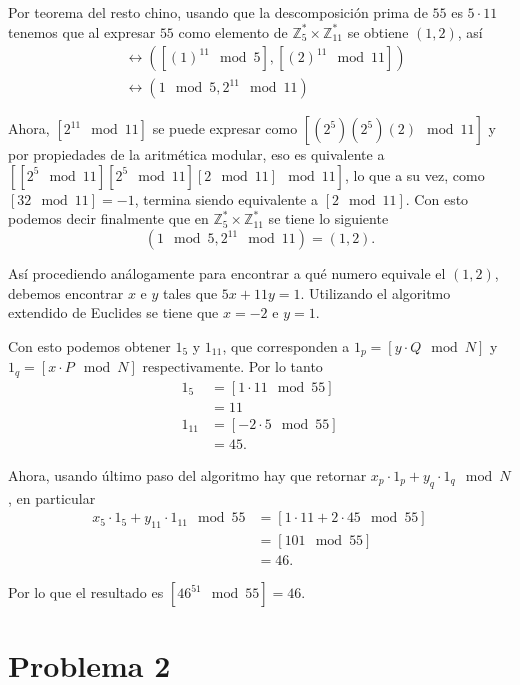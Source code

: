 \documentclass[twoside]{tareas}
\begin{document}
\begin{enumerate}
    Por teorema del resto chino, usando que la descomposición prima de $55$ es $5 \cdot 11$ tenemos que al expresar $55$ como elemento de $\mathbb{Z}^*_5 \times \mathbb{Z}^*_{11}$ se obtiene $(1, 2)$, así
    \begin{align*}
        [46^{11} \mod 55] &\leftrightarrow ([(1)^{11} \mod 5], [(2)^{11} \mod 11])\\
        &\leftrightarrow (1 \mod 5, 2^{11} \mod 11)
    \end{align*}

    Ahora, $[2^{11} \mod 11]$ se puede expresar como $[(2^5)(2^5)(2) \mod 11]$ y por propiedades de la aritmética modular, eso es quivalente a $[[2^5 \mod 11][2^5 \mod 11][2 \mod 11] \mod 11]$, lo que a su vez, como $[32 \mod 11] = -1$, termina siendo equivalente a $[2 \mod 11]$. Con esto podemos decir finalmente que en $\mathbb{Z}^*_5 \times \mathbb{Z}^*_{11}$ se tiene lo siguiente
    $$(1 \mod 5, 2^{11} \mod 11) = (1, 2).$$

    Así procediendo análogamente para encontrar a qué numero equivale el $(1, 2)$, debemos encontrar $x$ e $y$ tales que $5x + 11y = 1$. Utilizando el algoritmo extendido de Euclides se tiene que $x = -2$ e $y = 1$.

    Con esto podemos obtener $1_5$ y $1_{11}$, que corresponden a $1_p = [y\cdot Q \mod N]$ y $1_q = [x\cdot P \mod N]$ respectivamente. Por lo tanto
    \begin{align*}
        1_5 &= [1\cdot 11 \mod 55]\\&= 11\\
        1_{11} &= [-2\cdot 5 \mod 55]\\&= 45.
    \end{align*}

    Ahora, usando último paso del algoritmo hay que retornar $x_p \cdot 1_p + y_q \cdot 1_q \mod N$, en particular
    \begin{align*}
        x_5 \cdot 1_5 + y_11 \cdot 1_{11} \mod 55 &= [1 \cdot 11 + 2 \cdot 45 \mod 55]\\
        &= [101 \mod 55]\\
        &= 46.
    \end{align*}

    Por lo que el resultado es $[46^{51} \mod 55] = 46$.
\end{enumerate}

\section*{Problema 2}
\end{document}
